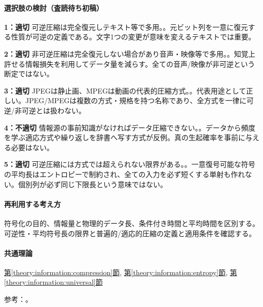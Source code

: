 \paragraph{選択肢の検討（査読待ち初稿）}\mbox{}\par

\noindent\textbf{1：適切} 可逆圧縮は完全復元しテキスト等で多用。。元ビット列を一意に復元する性質が可逆の定義である。文字1つの変更が意味を変えるテキストでは重要。\par

\noindent\textbf{2：適切} 非可逆圧縮は完全復元しない場合があり音声・映像等で多用。。知覚上許せる情報損失を利用してデータ量を減らす。全ての音声/映像が非可逆という断定ではない。\par

\noindent\textbf{3：適切} JPEGは静止画、MPEGは動画の代表的圧縮方式。。代表用途として正しい。JPEG/MPEGは複数の方式・規格を持つ名称であり、全方式を一律に可逆/非可逆とは扱わない。\par

\noindent\textbf{4：不適切} 情報源の事前知識がなければデータ圧縮できない。。データから頻度を学ぶ適応方式や繰り返しを辞書へ写す方式が反例。真の生起確率を事前に与える必要はない。\par

\noindent\textbf{5：適切} 可逆圧縮には方式では超えられない限界がある。。一意復号可能な符号の平均長はエントロピーで制約され、全ての入力を必ず短くする単射も作れない。個別列が必ず同じ下限長という意味ではない。\par

\paragraph{再利用する考え方} 符号化の目的、情報量と物理的データ長、条件付き時間と平均時間を区別する。可逆性・平均符号長の限界と普遍的/適応的圧縮の定義と適用条件を確認する。

\paragraph{共通理論} \hyperref[theory:information:compression]{第\ref*{theory:information:compression}節}, \hyperref[theory:information:entropy]{第\ref*{theory:information:entropy}節}, \hyperref[theory:information:universal]{第\ref*{theory:information:universal}節}

\par 参考：\cite{info_deflate,info_lossless,info_universal,info_jpeg,info_mpeg}。

